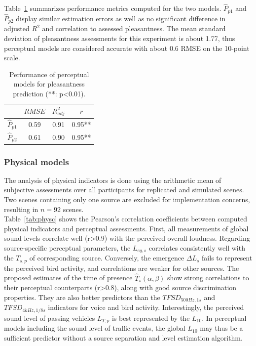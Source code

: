 \documentclass[11pt,a4paper]{article}
\begin{document}
Table~\ref{tab:percm} summarizes performance metrics computed for the two models. $\hat P_{p1}$ and $\hat P_{p2}$ display similar estimation errors as well as no significant difference in adjusted $R^2$ and correlation to assessed pleasantness. The mean standard deviation of pleasantness assessments for this experiment is about 1.77, thus perceptual models are considered accurate with about 0.6 RMSE on the 10-point scale.

\begin{table}[t]
\centering
\caption{Performance of perceptual models for pleasantness prediction (**: p<0.01).}
\label{tab:percm}
\begin{tabular}{ c | c | c | c }
\hline
	 & $RMSE$ & $R^2_{adj}$ & $r$ \\ \hline
	$\hat P_{p1}$ & 0.59 & 0.91 & 0.95** \\
	$\hat P_{p2}$ & 0.61 & 0.90 & 0.95** \\ \hline
\end{tabular}
\end{table}

\subsubsection{Physical models}
\label{sec:base_phys}

The analysis of physical indicators is done using the arithmetic mean of subjective assessments over all participants for replicated and simulated scenes. Two scenes containing only one source are excluded for implementation concerns, resulting in $n=92$ scenes.\\

Table~\ref{tab:physc} shows the Pearson's correlation coefficients between computed physical indicators and perceptual assessments. First, all measurements of global sound levels correlate well (r>0.9) with the perceived overall loudness. Regarding source-specific perceptual parameters, the $L_{eq, s}$ correlates consistently well with the $T_{s, p}$ of corresponding source. Conversely, the emergence $\Delta L_s$ fails to represent the perceived bird activity, and correlations are weaker for other sources. The proposed estimates of the time of presence $\hat T_s(\alpha, \beta)$ show strong correlations to their perceptual counterparts (r>0.8), along with good source discrimination properties. They are also better predictors than the $TFSD_{500Hz, 1s}$ and $TFSD_{4kHz, 1/8s}$ indicators for voice and bird activity. Interestingly, the perceived sound level of passing vehicles $L_{T, p}$ is best represented by the $L_{10}$. In perceptual models including the sound level of traffic events, the global $L_{10}$ may thus be a sufficient predictor without a source separation and level estimation algorithm.\\
\end{document}
